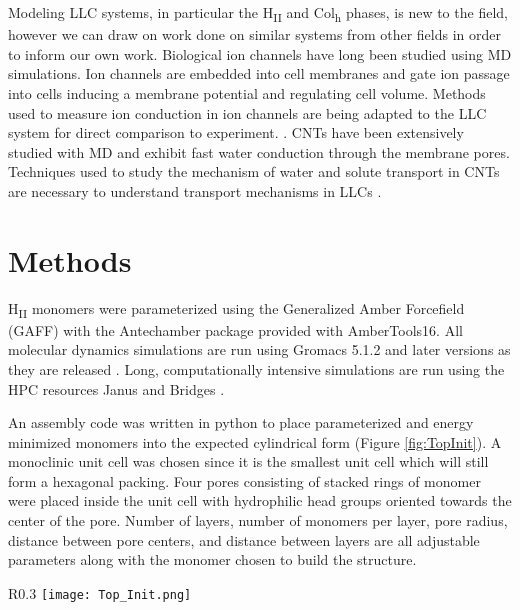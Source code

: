 \documentclass[12pt]{article}
\begin{document}
Modeling LLC systems, in particular the H\textsubscript{II}  and Col\textsubscript{h} phases, is new to the field, however we can draw on work done on similar systems from other fields in order to inform our own work. Biological ion channels have long been studied using MD simulations. Ion channels are embedded into cell membranes and gate ion passage into cells inducing a membrane potential and regulating cell volume. Methods used to measure ion conduction in ion channels are being adapted to the LLC system for direct comparison to experiment. \cite{aksimentiev_imaging_2005, gumbart_constant_2012}. CNTs have been extensively studied with MD and exhibit fast water conduction through the membrane pores. Techniques used to study the mechanism of water and solute transport in CNTs are necessary to understand transport mechanisms in LLCs \cite{zhu_water_2003}.

\section{Methods}

H\textsubscript{II} monomers were parameterized using the Generalized Amber Forcefield (GAFF) with the Antechamber package provided with AmberTools16\cite{case_ambertools16_2016,wang_development_2004, wang_automatic_2006}. All molecular dynamics simulations are run using Gromacs 5.1.2 and later versions as they are released \cite{bekker_gromacs:_1993, berendsen_gromacs:_1995, lindahl_gromacs_2001, van_der_spoel_gromacs:_2005, hess_gromacs_2008}. Long, computationally intensive simulations are run using the HPC resources Janus and Bridges \cite{nystrom_bridges:_2015, towns_xsede:_2014}.

An assembly code was written in python to place parameterized and energy minimized monomers into the expected cylindrical form (Figure \ref{fig:TopInit}). A monoclinic unit cell was chosen since it is the smallest unit cell which will still form a hexagonal packing. Four pores consisting of stacked rings of monomer were placed inside the unit cell with hydrophilic head groups oriented towards the center of the pore. Number of layers, number of monomers per layer, pore radius, distance between pore centers, and distance between layers are all adjustable parameters along with the monomer chosen to build the structure.

\begin{wrapfigure}{R}{0.3\textwidth}
	\centering
	\texttt{[image: Top\_Init.png]}
	\caption{\label{fig:TopInit} A top down view of the initial configuration created using the assembly python script}
\end{wrapfigure}
\end{document}
